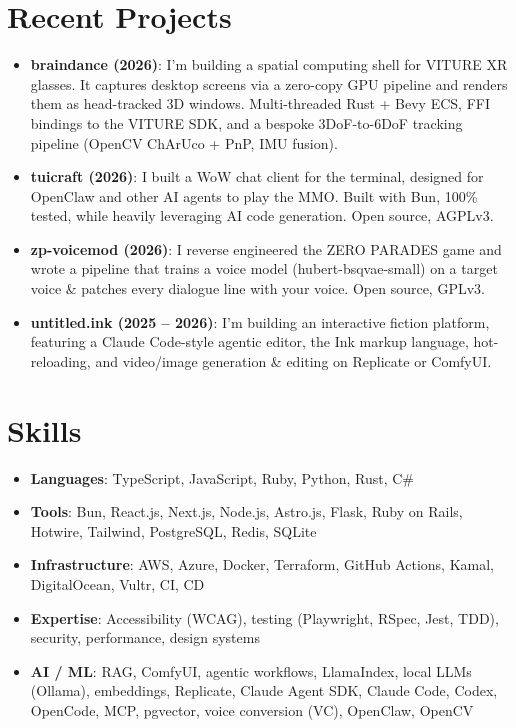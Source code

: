 \documentclass[11pt]{article}
\newcommand{\resumeItem}[2]{
\item\small{
    \textbf{#1}{: #2 \vspace{-2pt}}
  }
}
\newcommand{\resumeSubHeadingListStart}{
\begin{itemize}[leftmargin=*, topsep=0pt, itemsep=6pt, parsep=0pt]}
\newcommand{\resumeSubHeadingListEnd}{
\end{itemize}}
\begin{document}
\section{Recent Projects}
\resumeSubHeadingListStart


\resumeItem{braindance (2026)}
{I'm building a spatial computing shell for VITURE XR glasses. It captures
desktop screens via a zero-copy GPU pipeline and renders them as head-tracked 3D
windows. Multi-threaded Rust + Bevy ECS, FFI bindings to the VITURE SDK, and a
bespoke 3DoF-to-6DoF tracking pipeline (OpenCV ChArUco + PnP, IMU fusion).}

\resumeItem{tuicraft (2026)}
{I built a WoW chat client for the terminal, designed for OpenClaw and other AI
agents to play the MMO. Built with Bun, 100\% tested, while heavily leveraging
AI code generation. Open source, AGPLv3.}

\resumeItem{zp-voicemod (2026)}
{I reverse engineered the ZERO PARADES game and wrote a pipeline that trains a
voice model (hubert-bsqvae-small) on a target voice \& patches every dialogue
line with your voice. Open source, GPLv3.}

\resumeItem{untitled.ink (2025 -- 2026)}
{I'm building an interactive fiction platform, featuring a Claude Code-style
agentic editor, the Ink markup language, hot-reloading, and video/image
generation \& editing on Replicate or ComfyUI.}

\resumeSubHeadingListEnd

\section{Skills}
\resumeSubHeadingListStart

\resumeItem{Languages}
{TypeScript, JavaScript, Ruby, Python, Rust, C\#}

\resumeItem{Tools}
{Bun, React.js, Next.js, Node.js, Astro.js, Flask, Ruby on Rails, Hotwire,
Tailwind, PostgreSQL, Redis, SQLite}

\resumeItem{Infrastructure}
{AWS, Azure, Docker, Terraform, GitHub Actions, Kamal, DigitalOcean, Vultr, CI,
CD}

\resumeItem{Expertise}
{Accessibility (WCAG), testing (Playwright, RSpec, Jest, TDD), security,
performance, design systems}

\resumeItem{AI / ML}
{RAG, ComfyUI, agentic workflows, LlamaIndex, local LLMs (Ollama), embeddings,
Replicate, Claude Agent SDK, Claude Code, Codex, OpenCode, MCP, pgvector, voice
conversion (VC), OpenClaw, OpenCV}

\resumeSubHeadingListEnd
\end{document}
